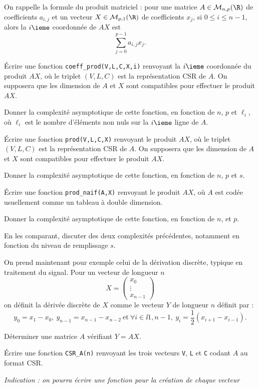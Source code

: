\bigskip{}

On rappelle la formule du produit matriciel : pour une matrice $A \in \mathcal{M}_{n,p}(\R)$ de coefficients $a_{i,j}$ et un vecteur $X \in \mathcal{M}_{p,1}(\R)$ de coefficients $x_j$, si $0 \leq i \leq n-1$, alors la $i\ieme$ coordonnée de $AX$ est 
\begin{equation*}
    \sum_{j=0}^{p-1} a_{i,j} x_j.
\end{equation*}

\bigskip{}

\question{} Écrire une fonction \texttt{coeff\_prod(V,L,C,X,i)} renvoyant la $i\ieme$ coordonnée du produit $AX$, où le triplet $(V,L,C)$ est la représentation CSR de $A$. 
On supposera que les dimension de $A$ et $X$ sont compatibles pour effectuer le produit $AX$.

Donner la complexité asymptotique de cette fonction, en fonction de $n$, $p$ et $\ell_i$, où $\ell_i$ est le nombre d'éléments non nuls sur la $i\ieme$ ligne de $A$. 

\question{} Écrire une fonction \texttt{prod(V,L,C,X)} renvoyant le produit $AX$, où le triplet $(V,L,C)$ est la représentation CSR de $A$.  
On supposera que les dimension de $A$ et $X$ sont compatibles pour effectuer le produit $AX$.

Donner la complexité asymptotique de cette fonction, en fonction de $n$, $p$ et $s$. 

\question{} Écrire une fonction \texttt{prod\_naif(A,X)} renvoyant le produit $AX$, où $A$ est codée usuellement comme un tableau à double dimension.  

Donner la complexité asymptotique de cette fonction, en fonction de $n$, et $p$.

\question{} En les comparant, discuter des deux complexités précédentes, notamment en fonction du niveau de remplissage $s$. 

\bigskip{}

On prend maintenant pour exemple celui de la dérivation discrète, typique en traitement du signal. Pour un vecteur de longueur $n$
\begin{equation*}
    X = \begin{pmatrix} x_0 \\ \vdots \\ x_{n-1} \end{pmatrix}
\end{equation*}
on définit la dérivée discrète de $X$ comme le vecteur $Y$ de longueur $n$ définit par : 
\begin{equation*}
    y_0 = x_1-x_0,~y_{n-1} = x_{n-1} - x_{n-2}~\textrm{et}~\forall i \in \ii{1,n-1},~ y_i = \dfrac{1}{2}(x_{i+1}-x_{i-1}).
\end{equation*}

\question{} Déterminer une matrice $A$ vérifiant $Y = AX$. 

\question{} Écrire une fonction \texttt{CSR\_A(n)} renvoyant les trois vecteurs \texttt{V}, \texttt{L} et \texttt{C} codant $A$ au format CSR.

\emph{Indication : on pourra écrire une fonction pour la création de chaque vecteur}

